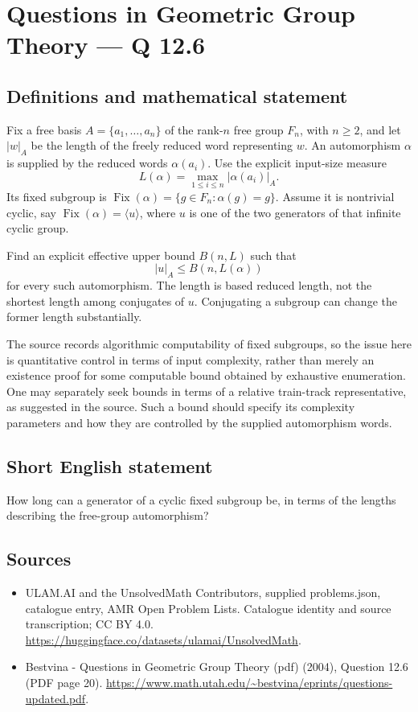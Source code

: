 \documentclass[11pt,a4paper]{article}
\begin{document}
\section*{Questions in Geometric Group Theory — Q 12.6}\label{statement}

\subsection{Definitions and mathematical statement}
Fix a free basis $A=\{a_1,\ldots,a_n\}$ of the rank-$n$ free group $F_n$, with $n\geq2$, and let $|w|_A$ be the length of the freely reduced word representing $w$. An automorphism $\alpha$ is supplied by the reduced words $\alpha(a_i)$. Use the explicit input-size measure
\[
 L(\alpha)=\max_{1\leq i\leq n}|\alpha(a_i)|_A.
\]
Its fixed subgroup is $\operatorname{Fix}(\alpha)=\{g\in F_n:\alpha(g)=g\}$. Assume it is nontrivial cyclic, say $\operatorname{Fix}(\alpha)=\langle u\rangle$, where $u$ is one of the two generators of that infinite cyclic group.

Find an explicit effective upper bound $B(n,L)$ such that
\[
 |u|_A\leq B(n,L(\alpha))
\]
for every such automorphism. The length is based reduced length, not the shortest length among conjugates of $u$. Conjugating a subgroup can change the former length substantially.

The source records algorithmic computability of fixed subgroups, so the issue here is quantitative control in terms of input complexity, rather than merely an existence proof for some computable bound obtained by exhaustive enumeration. One may separately seek bounds in terms of a relative train-track representative, as suggested in the source. Such a bound should specify its complexity parameters and how they are controlled by the supplied automorphism words.
\subsection{Short English statement}
How long can a generator of a cyclic fixed subgroup be, in terms of the lengths describing the free-group automorphism?
\subsection{Sources}
\begin{itemize}
\item[S1] ULAM.AI and the UnsolvedMath Contributors, supplied problems.json, catalogue entry, AMR Open Problem Lists. Catalogue identity and source transcription; CC BY 4.0.
\url{https://huggingface.co/datasets/ulamai/UnsolvedMath}.
\item[S2] Bestvina - Questions in Geometric Group Theory (pdf) (2004), Question 12.6 (PDF page 20). 
\url{https://www.math.utah.edu/~bestvina/eprints/questions-updated.pdf}.
\end{itemize}
\end{document}

